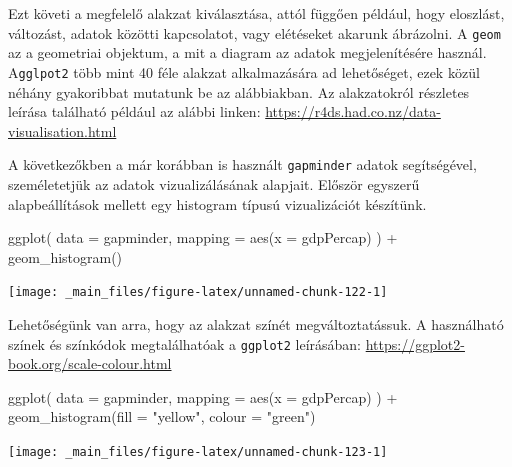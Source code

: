 \documentclass[
]{book}
\newenvironment{Shaded}{\begin{snugshade}}{\end{snugshade}}
\newcommand{\AttributeTok}[1]{\textcolor[rgb]{0.77,0.63,0.00}{#1}}
\newcommand{\FunctionTok}[1]{\textcolor[rgb]{0.00,0.00,0.00}{#1}}
\newcommand{\NormalTok}[1]{#1}
\newcommand{\SpecialCharTok}[1]{\textcolor[rgb]{0.00,0.00,0.00}{#1}}
\newcommand{\StringTok}[1]{\textcolor[rgb]{0.31,0.60,0.02}{#1}}
\begin{document}
Ezt követi a megfelelő alakzat kiválasztása, attól függően például, hogy
eloszlást, változást, adatok közötti kapcsolatot, vagy elétéseket
akarunk ábrázolni. A \texttt{geom} az a geometriai objektum, a mit a
diagram az adatok megjelenítésére használ. A\texttt{gglpot2} több mint
40 féle alakzat alkalmazására ad lehetőséget, ezek közül néhány
gyakoribbat mutatunk be az alábbiakban. Az alakzatokról részletes
leírása található például az alábbi linken:
\url{https://r4ds.had.co.nz/data-visualisation.html}

A következőkben a már korábban is használt \texttt{gapminder} adatok
segítségével, személetetjük az adatok vizualizálásának alapjait. Először
egyszerű alapbeállítások mellett egy histogram típusú vizualizációt
készítünk.

\begin{Shaded}
\begin{Highlighting}[]
\FunctionTok{ggplot}\NormalTok{(}
  \AttributeTok{data =}\NormalTok{ gapminder,}
  \AttributeTok{mapping =} \FunctionTok{aes}\NormalTok{(}\AttributeTok{x =}\NormalTok{ gdpPercap)}
\NormalTok{) }\SpecialCharTok{+}
  \FunctionTok{geom\_histogram}\NormalTok{()}
\end{Highlighting}
\end{Shaded}

\begin{center}\texttt{[image: \_main\_files/figure-latex/unnamed-chunk-122-1]} \end{center}

Lehetőségünk van arra, hogy az alakzat színét megváltoztatássuk. A
használható színek és színkódok megtalálhatóak a \texttt{ggplot2}
leírásában: \url{https://ggplot2-book.org/scale-colour.html}

\begin{Shaded}
\begin{Highlighting}[]
\FunctionTok{ggplot}\NormalTok{(}
  \AttributeTok{data =}\NormalTok{ gapminder,}
  \AttributeTok{mapping =} \FunctionTok{aes}\NormalTok{(}\AttributeTok{x =}\NormalTok{ gdpPercap)}
\NormalTok{) }\SpecialCharTok{+}
  \FunctionTok{geom\_histogram}\NormalTok{(}\AttributeTok{fill =} \StringTok{"yellow"}\NormalTok{, }\AttributeTok{colour =} \StringTok{"green"}\NormalTok{)}
\end{Highlighting}
\end{Shaded}

\begin{center}\texttt{[image: \_main\_files/figure-latex/unnamed-chunk-123-1]} \end{center}
\end{document}
